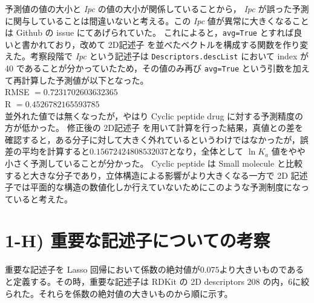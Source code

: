 \documentclass[a4j,11pt]{jarticle}
\begin{document}
予測値の値の大小と \textit{Ipc} の値の大小が関係していることから， \textit{Ipc} が誤った予測に関与していることは間違いないと考える。この \textit{Ipc} 値が異常に大きくなることは Github の issue にてあげられていた。\cite{git_ipc} これによると，\texttt{avg=True} とすれば良いと書かれており，改めて 2D記述子 を並べたベクトルを構成する関数を作り変えた。考察段階で \textit{Ipc} という記述子は \texttt{Descriptors.descList} において index が 40 であることが分かっていたため，その値のみ再び \texttt{avg=True} という引数を加えて再計算した予測値が以下となった。\\
\linebreak
RMSE $= 0.7231702603632365$\\
R $= 0.4526782165593785$ \\

並外れた値では無くなったが，やはり Cyclic peptide drug に対する予測精度の方が低かった。
修正後の 2D記述子 を用いて計算を行った結果，真値との差を確認すると，ある分子に対して大きく外れているというわけではなかったが，誤差の平均を計算すると$0.15672424808532037$となり，全体として $\ln{K_a}$ 値をやや小さく予測していることが分かった。 Cyclic peptide は Small molecule と比較すると大きな分子であり，立体構造による影響がより大きくなる一方で 2D 記述子では平面的な構造の数値化しか行えていないためにこのような予測制度になっていると考えた。

\section{1-H) 重要な記述子についての考察}
重要な記述子を Lasso 回帰において係数の絶対値が$0.075$より大きいものであると定義する。その時，重要な記述子は RDKit の 2D descriptors $208$ の内，$6$に絞られた。それらを係数の絶対値の大きいものから順に示す。\\
\end{document}
